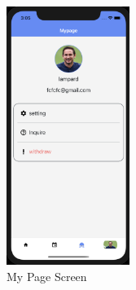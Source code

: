 \documentclass[conference]{IEEEtran}
\begin{document}
\begin{enumerate}
    \begin{figure}[h]
        \centering
        \includegraphics[width=4cm]{images/mypage.png}
        \caption{My Page Screen}
        \label{fig:my_label}
    \end{figure}
   

\end{enumerate}
\end{document}
